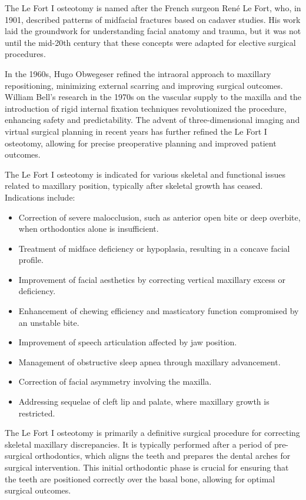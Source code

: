 The Le Fort I osteotomy is named after the French surgeon René Le Fort, who, in 1901, described patterns of midfacial fractures based on cadaver studies. His work laid the groundwork for understanding facial anatomy and trauma, but it was not until the mid-20th century that these concepts were adapted for elective surgical procedures.

In the 1960s, Hugo Obwegeser refined the intraoral approach to maxillary repositioning, minimizing external scarring and improving surgical outcomes. William Bell's research in the 1970s on the vascular supply to the maxilla and the introduction of rigid internal fixation techniques revolutionized the procedure, enhancing safety and predictability. The advent of three-dimensional imaging and virtual surgical planning in recent years has further refined the Le Fort I osteotomy, allowing for precise preoperative planning and improved patient outcomes.

The Le Fort I osteotomy is indicated for various skeletal and functional issues related to maxillary position, typically after skeletal growth has ceased. Indications include:

\begin{itemize}
  \item Correction of severe malocclusion, such as anterior open bite or deep overbite, when orthodontics alone is insufficient.
  \item Treatment of midface deficiency or hypoplasia, resulting in a concave facial profile.
  \item Improvement of facial aesthetics by correcting vertical maxillary excess or deficiency.
  \item Enhancement of chewing efficiency and masticatory function compromised by an unstable bite.
  \item Improvement of speech articulation affected by jaw position.
  \item Management of obstructive sleep apnea through maxillary advancement.
  \item Correction of facial asymmetry involving the maxilla.
  \item Addressing sequelae of cleft lip and palate, where maxillary growth is restricted.
\end{itemize}

The Le Fort I osteotomy is primarily a definitive surgical procedure for correcting skeletal maxillary discrepancies. It is typically performed after a period of pre-surgical orthodontics, which aligns the teeth and prepares the dental arches for surgical intervention. This initial orthodontic phase is crucial for ensuring that the teeth are positioned correctly over the basal bone, allowing for optimal surgical outcomes.

